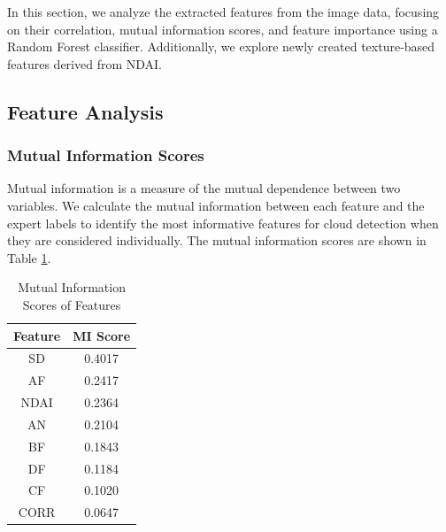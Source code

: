 \documentclass[10pt,letterpaper]{article}
\begin{document}




In this section, we analyze the extracted features from the image data, focusing on their correlation, mutual information scores, and feature importance using a Random Forest classifier. Additionally, we explore newly created texture-based features derived from NDAI.

\subsection{Feature Analysis}

\subsubsection{Mutual Information Scores}

Mutual information is a measure of the mutual dependence between two variables. We calculate the mutual information between each feature and the expert labels to identify the most informative features for cloud detection when they are considered individually. The mutual information scores are shown in Table \ref{tab:mi_scores}.

\begin{table}[ht]
    \centering
    \caption{Mutual Information Scores of Features}
    \label{tab:mi_scores}
    \begin{tabular}{cc}
    \hline
    \textbf{Feature} & \textbf{MI Score} \\ \hline
    SD               & 0.4017            \\
    AF               & 0.2417            \\
    NDAI             & 0.2364            \\
    AN               & 0.2104            \\
    BF               & 0.1843            \\
    DF               & 0.1184            \\
    CF               & 0.1020            \\
    CORR             & 0.0647           
    \end{tabular}
    \end{table}
\end{document}
